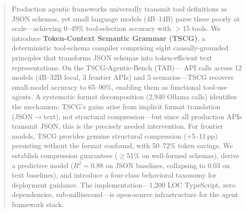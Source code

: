 \begin{abstract}
Production agentic frameworks universally transmit tool definitions as JSON schemas, yet small language models (4B--14B) parse these poorly at scale---achieving 0--49\% tool-selection accuracy with $>$15 tools. We introduce \textbf{Token-Context Semantic Grammar (TSCG)}, a deterministic tool-schema compiler comprising eight causally-grounded principles that transforms JSON schemas into token-efficient text representations. On the TSCG-Agentic-Bench (TAB)---\tscgTotalCalls{} API calls across 12 models (4B--32B local, 3 frontier APIs) and 5 scenarios---TSCG recovers small-model accuracy to 65--90\%, enabling them as functional tool-use agents. A systematic format decomposition (2{,}940 Ollama calls) identifies the mechanism: TSCG's gains arise from implicit format translation (JSON$\to$text), not structural compression---but since all production APIs transmit JSON, this is the precisely needed intervention. For frontier models, TSCG provides genuine structural compression ($+$5--11\,pp) persisting without the format confound, with 50--72\% token savings. We establish compression guarantees ($\geq$51\% on well-formed schemas), derive a predictive model ($R^2{=}0.88$ on JSON baselines, collapsing to 0.03 on text baselines), and introduce a four-class behavioral taxonomy for deployment guidance. The implementation---1{,}200 LOC TypeScript, zero dependencies, sub-millisecond---is open-source infrastructure for the agent framework stack.
\end{abstract}
